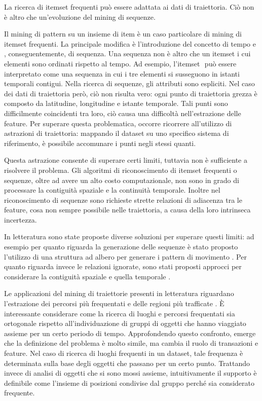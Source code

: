 La ricerca di itemset frequenti può essere adattata ai dati di traiettoria.
Ciò non è altro che un'evoluzione del mining di sequenze.

Il mining di pattern su un insieme di item è un caso particolare di mining di itemset frequenti.
La principale modifica è l'introduzione del concetto di tempo e , conseguentemente, di sequenza.
Una sequenza non è altro che un itemset i cui elementi sono ordinati rispetto al tempo.
Ad esempio, l'itemset \(<a, ab, c>\) può essere interpretato come una sequenza in cui i tre elementi
si susseguono in istanti temporali contigui.
Nella ricerca di sequenze, gli attributi sono espliciti.
Nel caso dei dati di traiettoria però, ciò non risulta vero: ogni punto di traiettoria grezza è composto da latitudine, longitudine e istante temporale.
Tali punti sono difficilmente coincidenti tra loro, ciò causa una difficoltà nell'estrazione delle feature.
Per superare questa problematica, occorre ricorrere all'utilizzo di astrazioni di traiettoria:
mappando il dataset su uno specifico sistema di riferimento, è possibile accomunare i punti negli stessi quanti.

Questa astrazione consente di superare certi limiti, tuttavia non è sufficiente a risolvere il problema.
Gli algoritmi di riconoscimento di itemset frequenti o sequenze, oltre ad avere un alto costo computazionale, non sono in grado di processare la contiguità spaziale e la continuità temporale.
Inoltre nel riconoscimento di sequenze sono richieste strette relazioni di adiacenza tra le feature, cosa non sempre possibile nelle traiettoria, a causa della loro intrinseca incertezza.

In letteratura sono state proposte diverse soluzioni per superare questi limiti:
ad esempio per quanto riguarda la generazione delle sequenze è stato proposto l'utilizzo di una struttura ad albero per generare i pattern di movimento \cite{cao2005mining}.
Per quanto riguarda invece le relazioni ignorate, sono stati proposti approcci per considerare la contiguità spaziale \cite{chen2011personal} e quella temporale \cite{lv2015route}. 

Le applicazioni del mining di traiettorie presenti in letteratura riguardano l'estrazione dei percorsi 
più frequentati \cite{qiu2016mining} e delle regioni più trafficate \cite{zheng2018spatial}.
È interessante considerare come la ricerca di luoghi e percorsi frequentati sia ortogonale rispetto all'individuazione di gruppi di oggetti che hanno viaggiato assieme per un certo periodo di tempo.
Approfondendo questo confronto, emerge che la definizione del problema è molto simile, ma cambia il ruolo di transazioni e feature.
Nel caso di ricerca di luoghi frequenti in un dataset, tale frequenza è determinata sulla base degli oggetti che passano per un certo punto.
Trattando invece di analisi di oggetti che si sono mossi assieme, 
intuitivamente il supporto è definibile come l'insieme di posizioni condivise dal gruppo perché sia considerato frequente.

